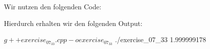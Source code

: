 \section{}

Wir nutzen den folgenden Code:



Hierdurch erhalten wir den folgenden Output:

\begin{consoleoutput}
  $ g++ exercise_07_33.cpp -o exercise_07_33
  $ ./exercise_07_33 
  1.999999178
\end{consoleoutput}
